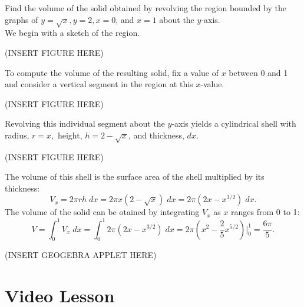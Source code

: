 \documentclass{ximera}
\begin{document}
\begin{example} Find the volume of the solid obtained by revolving the region bounded by the graphs of $y = \sqrt x, y=2, x=0$, and $x = 1$ about the $y$-axis.\\
We begin with a sketch of the region.

(INSERT FIGURE HERE)

To compute the volume of the resulting solid, fix a value of $x$ between 0 and 1 and consider a vertical segment in the region at this $x$-value.

(INSERT FIGURE HERE)

Revolving this individual segment about the $y$-axis yields a cylindrical shell with radius, $r = x,$ height, $h = 2 - \sqrt x$, and thickness, $dx$. 

(INSERT FIGURE HERE)

The volume of this shell is the surface area of the shell multiplied by its thickness:
\[
V_x = 2\pi rh \;dx = 2\pi x(2 - \sqrt x) \; dx = 2\pi \left(2x - x^{3/2}\right) \; dx.
\]
The volume of the solid can be otained by integrating $V_x$ as $x$ ranges from 0 to 1:
\[
V = \int_0^1 V_x \; dx = \int_0^1 2\pi \left(2x - x^{3/2}\right) \; dx = 2\pi \left(x^2 - \frac25 x^{5/2}\right)\bigg|_0^1 = \frac{6\pi}{5}.
\]


(INSERT GEOGEBRA APPLET HERE)

\end{example}


































\section{Video Lesson}




\begin{center}
\begin{foldable}
\end{foldable}
\end{center}
\end{document}
